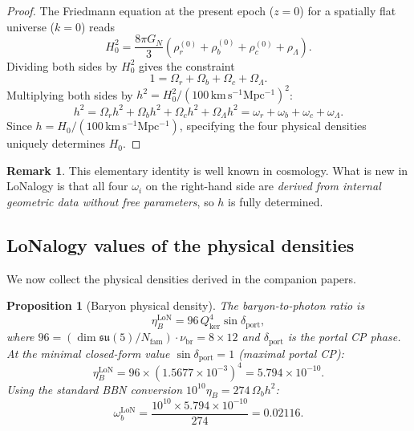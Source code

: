 \documentclass[12pt]{article}
\theoremstyle{plain}
\newtheorem{proposition}[theorem]{Proposition}
\theoremstyle{definition}
\newtheorem{remark}[theorem]{Remark}
\numberwithin{equation}{section}
\newcommand{\br}{\mathrm{br}}
\newcommand{\kker}{\mathrm{ker}}
\newcommand{\LoN}{\mathrm{LoN}}
\newcommand{\port}{\mathrm{port}}
\begin{document}
\begin{proof}
The Friedmann equation at the present epoch ($z=0$) for a spatially flat
universe ($k=0$) reads
\begin{equation}
H_0^2 = \frac{8\pi G_N}{3}\left(\rho_r^{(0)}+\rho_b^{(0)}+\rho_c^{(0)}+\rho_\Lambda\right).
\end{equation}
Dividing both sides by $H_0^2$ gives the constraint
\begin{equation}
1 = \Omega_r + \Omega_b + \Omega_c + \Omega_\Lambda.
\end{equation}
Multiplying both sides by $h^2=H_0^2/(100\,\mathrm{km\,s^{-1}Mpc^{-1}})^2$:
\begin{equation}
h^2 = \Omega_r h^2 + \Omega_b h^2 + \Omega_c h^2 + \Omega_\Lambda h^2
    = \omega_r + \omega_b + \omega_c + \omega_\Lambda.
\end{equation}
Since $h=H_0/(100\,\mathrm{km\,s^{-1}Mpc^{-1}})$, specifying the four
physical densities uniquely determines $H_0$.
\end{proof}

\begin{remark}
This elementary identity is well known in cosmology.  What is new in
LoNalogy is that all four $\omega_i$ on the right-hand side are
\emph{derived from internal geometric data without free parameters},
so $h$ is fully determined.
\end{remark}


\subsection{LoNalogy values of the physical densities}

We now collect the physical densities derived in the companion papers.

\begin{proposition}[Baryon physical density]\label{prop:omegab}
The baryon-to-photon ratio is~\cite{ParticleCosmo}
\begin{equation}
\eta_B^{\LoN} = 96\,Q_{\kker}^4\sin\delta_{\port},
\end{equation}
where $96=(\dim\mathfrak{su}(5)/N_{\mathrm{fam}})\cdot\nu_{\br}=8\times12$
and $\delta_{\port}$ is the portal CP phase.
At the minimal closed-form value $\sin\delta_{\port}=1$ (maximal portal CP):
\begin{equation}
\eta_B^{\LoN} = 96\times(1.5677\times10^{-3})^4 = 5.794\times10^{-10}.
\end{equation}
Using the standard BBN conversion $10^{10}\eta_B=274\,\Omega_b h^2$:
\begin{equation}\label{eq:omegab}
\boxed{\omega_b^{\LoN} = \frac{10^{10}\times5.794\times10^{-10}}{274} = 0.02116.}
\end{equation}
\end{proposition}
\end{document}
